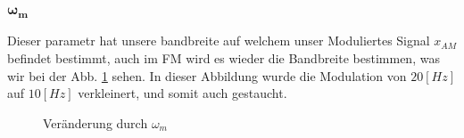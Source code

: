\subsubsection{$\bm{\omega_m}$}
Dieser parametr hat unsere bandbreite auf welchem unser Moduliertes Signal \(x_{AM}\) befindet bestimmt, auch im FM wird es wieder die Bandbreite bestimmen,
was wir bei der Abb. \ref{fig:fm:fm_10} sehen. 
In dieser Abbildung wurde die Modulation von \(20 [Hz]\) auf \( 10[Hz]\) verkleinert, und somit auch gestaucht. 
\begin{figure}[h]
	\centering
	
	\caption{Veränderung durch \(\omega_m\)}
	\label{fig:fm:fm_10}
\end{figure}






